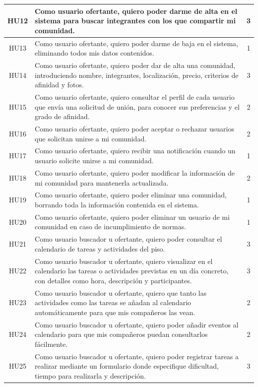 \begin{longtable}{|c|p{12cm}|c|}
    \hline
    HU12 & Como usuario ofertante, quiero poder darme de alta en el sistema para buscar integrantes con los que compartir mi comunidad. & 3 \\
    \hline
    HU13 & Como usuario ofertante, quiero poder darme de baja en el sistema, eliminando todos mis datos contenidos. & 1 \\
    \hline
    HU14 & Como usuario ofertante, quiero poder dar de alta una comunidad, introduciendo nombre, integrantes, localización, precio, criterios de afinidad y fotos. & 3 \\
    \hline
    HU15 & Como usuario ofertante, quiero consultar el perfil de cada usuario que envía una solicitud de unión, para conocer sus preferencias y el grado de afinidad. & 2 \\
    \hline
    HU16 & Como usuario ofertante, quiero poder aceptar o rechazar usuarios que solicitan unirse a mi comunidad. & 2 \\
    \hline
    HU17 & Como usuario ofertante, quiero recibir una notificación cuando un usuario solicite unirse a mi comunidad. & 1 \\ 
    \hline
    HU18 & Como usuario ofertante, quiero poder modificar la información de mi comunidad para mantenerla actualizada. & 2 \\
    \hline
    HU19 & Como usuario ofertante, quiero poder eliminar una comunidad, borrando toda la información contenida en el sistema. & 1 \\
    \hline
    HU20 & Como usuario ofertante, quiero poder eliminar un usuario de mi comunidad en caso de incumplimiento de normas. & 1 \\
    \hline
    HU21 & Como usuario buscador u ofertante, quiero poder consultar el calendario de tareas y actividades del piso. & 3 \\
    \hline
    HU22 & Como usuario buscador u ofertante, quiero visualizar en el calendario las tareas o actividades previstas en un día concreto, con detalles como hora, descripción y participantes. & 3 \\
    \hline
    HU23 & Como usuario buscador u ofertante, quiero que tanto las actividades como las tareas se añadan al calendario automáticamente para que mis compañeros las vean. & 2 \\
    \hline
    HU24 & Como usuario buscador u ofertante, quiero poder añadir eventos al calendario para que mis compañeros puedan consultarlos fácilmente. & 2 \\
    \hline
    HU25 & Como usuario buscador u ofertante, quiero poder registrar tareas a realizar mediante un formulario donde especifique dificultad, tiempo para realizarla y descripción. & 3 \\

\end{longtable}
